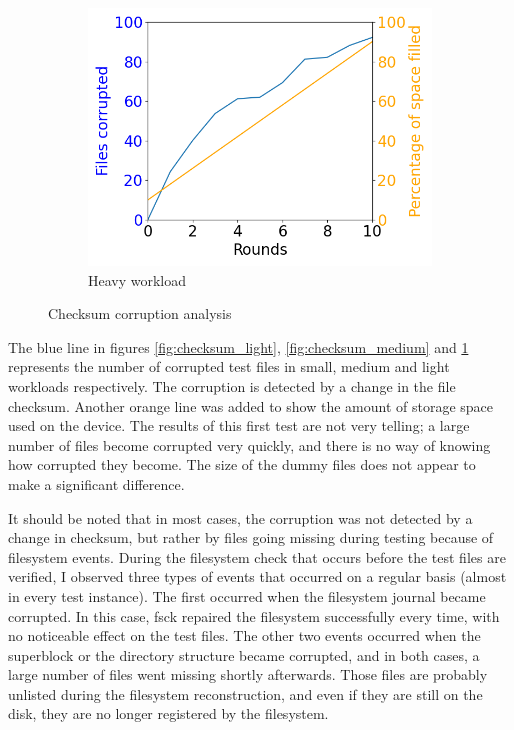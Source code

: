 \documentclass[a4paper,11pt,oneside]{report}
\begin{document}
\begin{figure}[ht]
     \begin{subfigure}[b]{0.3\textwidth}
         \centering
         \includegraphics[width=\textwidth]{Figures/average_checksum_corrupt_4MB.png}
         \caption{Heavy workload}
         \label{fig:checksum_heavy}
     \end{subfigure}
        \caption{Checksum corruption analysis}
        \label{fig:checksum_analysis}
\end{figure}

The blue line in figures \ref{fig:checksum_light}, \ref{fig:checksum_medium} and  \ref{fig:checksum_heavy} represents the number of corrupted test files in small, medium and light workloads respectively. The corruption is detected by a change in the file checksum. Another orange line was added to show the amount of storage space used on the device. The results of this first test are not very telling; a large number of files become corrupted very quickly, and there is no way of knowing how corrupted they become. The size of the dummy files does not appear to make a significant difference.

It should be noted that in most cases, the corruption was not detected by a change in checksum, but rather by files going missing during testing because of filesystem events. During the filesystem check that occurs before the test files are verified, I observed three types of events that occurred on a regular basis (almost in every test instance). The first occurred when the filesystem journal became corrupted. In this case, fsck repaired the filesystem successfully every time, with no noticeable effect on the test files. The other two events occurred when the superblock or the directory structure became corrupted, and in both cases, a large number of files went missing shortly afterwards. Those files are probably unlisted during the filesystem reconstruction, and even if they are still on the disk, they are no longer registered by the filesystem. 
\end{document}
